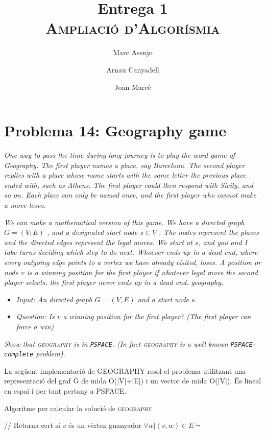 \documentclass[a4paper]{article}
\title{Entrega 1 \\ \textsc{Ampliació d'Algorísmia}}
\author{Marc Asenjo \and Arnau Canyadell \and Joan Marcè}
\date{}
\begin{document}
\maketitle

\section{Problema 14: Geography game}


\emph{One way to pass the time during long journey is to play the word game
of Geography. The first player names a place, say Barcelona. The second player replies
with a place whose name starts with the same letter the previous place ended with, such as
Athens. The first player could then respond with Sicily, and so on. Each place can only be
named once, and the first player who cannot make a move loses.}

\emph{We can make a mathematical version of this game. We have a directed graph $G = (V;E)$ ,
and a designated start node $s \in V$ . The nodes represent the places and the directed edges
represent the legal moves. We start at $s$, and you and I take turns deciding which step to
do next. Whoever ends up in a dead end, where every outgoing edge points to a vertex we
have already visited, loses. A position or node $v$ is a winning position for the first player if
whatever legal move the second player selects, the first player never ends up in a dead end.
geography.}

\begin{itemize}
	\item \emph{Input: An directed graph $G = (V, E)$ and a start node $s$.}
	\item \emph{Question: Is $v$ a winning position for the first player? (The first player can force a win)}
\end{itemize}

\emph{Show that \textsc{geography} is in \texttt{PSPACE}. (In fact \textsc{geography} is a well known \texttt{PSPACE-complete}
problem).}

La següent implementació de GEOGRAPHY resol el problema utilitzant una representació del graf G de mida O(|V|+|E|) i un vector de mida O(|V|). És lineal en espai i per tant pertany a PSPACE.

\begin{algorithm}[H]
	\caption{Algoritme per calcular la solució de \textsc{geography}}
	\begin{algorithmic}[1]
		\State // Retorna cert si $v$ és un vèrtex guanyador
			\State \Return $\forall w | (v,w) \in E \ \neg$ 
		\EndFunction
	\end{algorithmic}
\end{algorithm}
\end{document}
